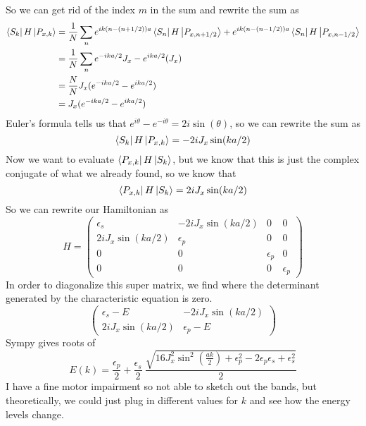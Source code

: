 \documentclass{article}
\begin{document}
So we can get rid of the index $m$ in the sum and rewrite the sum as
\begin{align}
    \bra{S_k}H\ket{P_{x,k}} &= \frac{1}{N}\sum_{n}e^{ik(n-(n+1/2))a}\bra{S_n}H\ket{P_{x,n+1/2}} + e^{ik(n-(n-1/2))a}\bra{S_n}H\ket{P_{x,n-1/2}} \\
    &= \frac{1}{N}\sum_{n}e^{-ika/2}J_x - e^{ika/2}(J_x)\\
    &= \frac{N}{N}J_x(e^{-ika/2}-e^{ika/2})\\
    &= J_x(e^{-ika/2}-e^{ika/2})\\
\end{align}
Euler's formula tells us that $e^{i\theta}-e^{-i\theta}=2i\sin(\theta)$, so we can rewrite the sum as
\begin{equation}
    \bra{S_k}H\ket{P_{x,k}} = -2iJ_x\sin(ka/2)
\end{equation}
Now we want to evaluate $\bra{P_{x,k}}H\ket{S_k}$, but we know that this is just the complex conjugate of what we already found, so we know that
\begin{equation}
    \bra{P_{x,k}}H\ket{S_k} = 2iJ_x\sin(ka/2)
\end{equation}
So we can rewrite our Hamiltonian as
\begin{equation}
    H = \begin{pmatrix}
    \epsilon_s & -2iJ_x\sin(ka/2) & 0 & 0\\
    2iJ_x\sin(ka/2) & \epsilon_p & 0 & 0\\
    0 & 0 & \epsilon_p & 0\\
    0 & 0 & 0 & \epsilon_p 
    \end{pmatrix}
\end{equation}
In order to diagonalize this super matrix, we find where the determinant generated by the characteristic equation is zero.
\begin{equation}
    \begin{pmatrix}
    \epsilon_s-E & -2iJ_x\sin(ka/2)\\
    2iJ_x\sin(ka/2) & \epsilon_p-E
    \end{pmatrix}
\end{equation}
Sympy gives roots of
\begin{equation}
    E(k) = \frac{\epsilon_{p}}{2} + \frac{\epsilon_{s}}{2} \ \frac{\sqrt{16 J_{x}^{2} \sin^{2}{\left(\frac{a k}{2} \right)} + \epsilon_{p}^{2} - 2 \epsilon_{p} \epsilon_{s} + \epsilon_{s}^{2}}}{2}
\end{equation}
I have a fine motor impairment so not able to sketch out the bands, but theoretically, we could just plug in different values for $k$ and see how the energy levels change.\\
\end{document}
